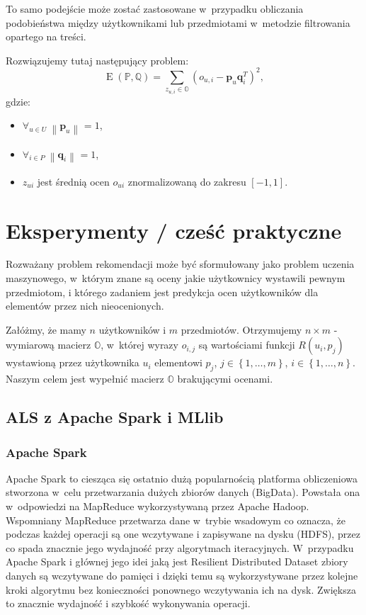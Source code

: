 \documentclass[12pt,a4paper]{report}
\newcommand{\set}[1]{\left\lbrace {#1} \right\rbrace}
\newcommand{\norm}[2][]{\left\| {#2} \right\|_{#1}}
\newcommand{\e}[1]{\operatorname{E}\left({#1} \right)}
\begin{document}
To samo podejście może zostać zastosowane w~przypadku obliczania podobieństwa między użytkownikami lub przedmiotami w~metodzie filtrowania opartego na treści.

Rozwiązujemy tutaj następujący problem:
$$
\e{\mathbb{P}, \mathbb{Q}} = \sum_{z_{u,i} \in \mathbb{O}}(o_{u,i} - \mathbf{p}_u\mathbf{q}_i^T)^2,
$$
gdzie:
\begin{itemize}
\item $\forall_{u \in \mathit{U}} \: \norm{\mathbf{p}_u} = 1$,
\item $\forall_{i \in \mathit{P}} \: \norm{\mathbf{q}_i} = 1$,
\item $z_{ui}$ jest średnią ocen $o_{ui}$ znormalizowaną do zakresu $[-1,1]$.
\end{itemize}

\chapter{Eksperymenty / cześć praktyczne}

Rozważany problem rekomendacji może być sformułowany jako problem uczenia maszynowego, w~którym znane są oceny jakie użytkownicy wystawili pewnym przedmiotom, i którego zadaniem jest predykcja ocen użytkowników dla elementów przez nich nieocenionych. 

Załóżmy, że mamy $n$ użytkowników i $m$ przedmiotów. Otrzymujemy $n \times m$ - wymiarową macierz $\mathbb{O}$, w~której wyrazy $o_{i,j}$ są wartościami funkcji $R(u_i,p_j)$ wystawioną przez użytkownika $u_i$ elementowi $p_j$, $j \in \set{1, \ldots, m}$, $i \in \set{1, \ldots, n}$. Naszym celem jest wypełnić macierz $\mathbb{O}$ brakującymi ocenami. 


\section{ALS z Apache Spark i MLlib}
\subsection{Apache Spark}
Apache Spark to ciesząca się ostatnio dużą popularnością platforma obliczeniowa stworzona w~celu przetwarzania dużych zbiorów danych (BigData). Powstała ona w~odpowiedzi na MapReduce wykorzystywaną przez Apache Hadoop. Wspomniany MapReduce przetwarza dane w~trybie wsadowym co oznacza, że podczas każdej operacji są one wczytywane i zapisywane na dysku (HDFS), przez co spada znacznie jego wydajność przy algorytmach iteracyjnych. W~przypadku Apache Spark i głównej jego idei jaką jest 
Resilient Distributed Dataset zbiory danych są wczytywane do pamięci i dzięki temu są wykorzystywane przez kolejne kroki algorytmu bez konieczności ponownego wczytywania ich na dysk. Zwiększa to znacznie wydajność i szybkość wykonywania operacji.
\end{document}
